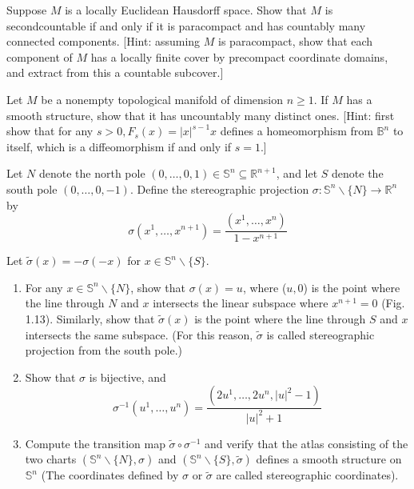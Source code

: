 \begin{problem}
    Suppose $M$ is a locally Euclidean Hausdorff space. Show that $M$ is secondcountable if and only if it is paracompact and has countably many connected components. [Hint: assuming $M$ is paracompact, show that each component of $M$ has a locally finite cover by precompact coordinate domains, and extract from this a countable subcover.]
\end{problem}
\begin{problem}
Let $M$ be a nonempty topological manifold of dimension $n \geq 1$. If $M$ has a smooth structure, show that it has uncountably many distinct ones. [Hint: first show that for any $s>0, F_s(x)=|x|^{s-1} x$ defines a homeomorphism from $\mathbb{B}^n$ to itself, which is a diffeomorphism if and only if $s=1$.]
\end{problem}
\begin{problem}
     Let $N$ denote the north pole $(0, \ldots, 0,1) \in \mathbb{S}^n \subseteq \mathbb{R}^{n+1}$, and let $S$ denote the south pole $(0, \ldots, 0,-1)$. Define the stereographic projection $\sigma: \mathbb{S}^n \backslash\{N\} \rightarrow \mathbb{R}^n$ by
$$
\sigma\left(x^1, \ldots, x^{n+1}\right)=\frac{\left(x^1, \ldots, x^n\right)}{1-x^{n+1}}
$$

Let $\tilde{\sigma}(x)=-\sigma(-x)$ for $x \in \mathbb{S}^n \backslash\{S\}$.
\begin{enumerate}
    \item For any $x \in \mathbb{S}^n \backslash\{N\}$, show that $\sigma(x)=u$, where ($u, 0$) is the point where the line through $N$ and $x$ intersects the linear subspace where $x^{n+1}=0$ (Fig. 1.13). Similarly, show that $\tilde{\sigma}(x)$ is the point where the line through $S$ and $x$ intersects the same subspace. (For this reason, $\tilde{\sigma}$ is called stereographic projection from the south pole.)
    \item Show that $\sigma$ is bijective, and
$$
\sigma^{-1}\left(u^1, \ldots, u^n\right)=\frac{\left(2 u^1, \ldots, 2 u^n,|u|^2-1\right)}{|u|^2+1}
$$
    \item Compute the transition map $\tilde{\sigma} \circ \sigma^{-1}$ and verify that the atlas consisting of the two charts $\left(\mathbb{S}^n \backslash\{N\}, \sigma\right)$ and $\left(\mathbb{S}^n \backslash\{S\}, \tilde{\sigma}\right)$ defines a smooth structure on $\mathbb{S}^n$ (The coordinates defined by $\sigma$ or $\tilde{\sigma}$ are called stereographic coordinates).
\end{enumerate}
\end{problem}
